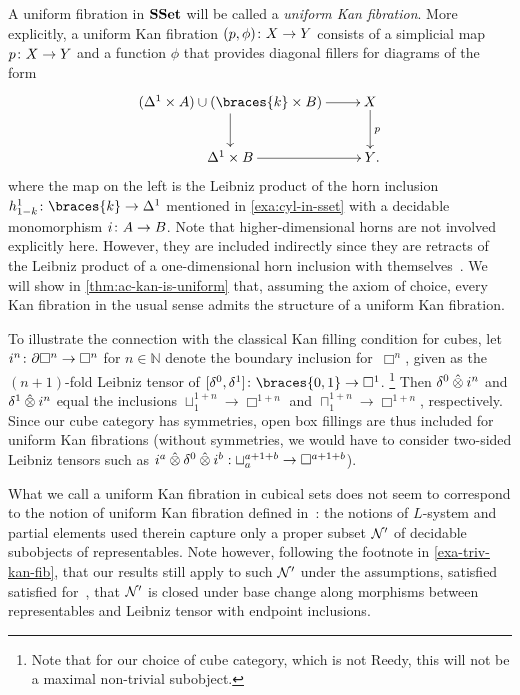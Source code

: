 \documentclass[reqno,10pt,a4paper,oneside,draft]{amsart}
\begin{document}
\begin{example}
A uniform fibration in $\SSet$ will be called a \emph{uniform Kan fibration}.
More explicitly, a uniform Kan fibration $(p, \phi) \co X \to Y$ consists of a simplicial map $p \co X \to Y$ and a function $\phi$ that provides diagonal fillers for diagrams of the form
\[
\xymatrix{
  (\Delta^1 \times A) \cup (\braces{k} \times B)
  \ar[r]
  \ar[d]
&
  X
  \ar[d]^{p}
\\
  \Delta^1 \times B
  \ar[r]
&
  Y
\rlap{.}}
\]
where the map on the left is the Leibniz product of the horn inclusion $h_{1-k}^1 \co \braces{k} \to \Delta^1$ mentioned in \cref{exa:cyl-in-sset} with a decidable monomorphism $i \co A \to B$.
Note that higher-dimensional horns are not involved explicitly here.
However, they are included indirectly since they are retracts of the Leibniz product of a one-dimensional horn inclusion with themselves~\cite[Chap.~IV, Sec.~2]{gabriel-zisman:calculus-of-fractions}.
We will show in \cref{thm:ac-kan-is-uniform} that, assuming the axiom of choice, every Kan fibration in the usual sense admits the structure of a uniform Kan fibration.
\end{example}

\begin{example}
To illustrate the connection with the classical Kan filling condition for cubes, let $i^n \co \partial \Box^n \to \Box^n$ for $n \in \mathbb{N}$ denote the boundary inclusion for~$\Box^n$, given as the $(n+1)$-fold Leibniz tensor of $[\lcyl, \rcyl] \co \braces{0, 1} \to \Box^1$.%
\footnote{Note that for our choice of cube category, which is not Reedy, this will not be a maximal non-trivial subobject.}
Then $\lcyl \hatotimes i^n$ and $\rcyl \hatotimes i^n$ equal the inclusions $\sqcup_1^{1+n} \to \Box^{1+n}$ and $\sqcap_1^{1+n} \to \Box^{1+n}$, respectively.
Since our cube category has symmetries, open box fillings are thus included for uniform Kan fibrations (without symmetries, we would have to consider two-sided Leibniz tensors such as $i^a \hatotimes \lcyl \hatotimes i^b : \sqcup_a^{a+1+b} \to \Box^{a+1+b}$).

What we call a uniform Kan fibration in cubical sets does not seem to correspond to the notion of uniform Kan fibration defined in~\cite{coquand-face,coquand-variation}: the notions of $L$-system and partial elements used therein capture only a proper subset $\cal{N}'$ of decidable subobjects of representables.
Note however, following the footnote in \cref{exa-triv-kan-fib}, that our results still apply to such $\cal{N}'$ under the assumptions, satisfied satisfied for~\cite{coquand-face,coquand-variation}, that $\cal{N}'$ is closed under base change along morphisms between representables and Leibniz tensor with endpoint inclusions.
\end{example}
\end{document}
